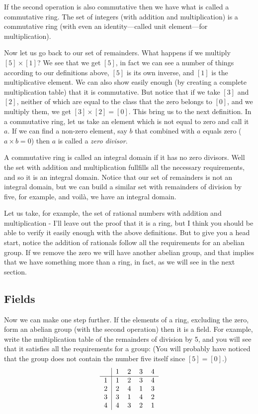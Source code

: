 If the second operation is also commutative then we have what is called
a commutative ring. The set of integers (with addition and
multiplication) is a commutative ring (with even an identity---called
unit element---for multiplication).

Now let us go back to our set of remainders. What happens if we multiply
$[5] \times [1]$? We see that we get $[5]$, in fact we can see a number
of things according to our definitions above, $[5]$ is its own inverse,
and $[1]$ is the multiplicative element. We can also show easily enough
(by creating a complete multiplication table) that it is
commutative. But notice that if we take $[3]$ and $[2]$, neither of
which are equal to the class that the zero belongs to $[0]$, and we
multiply them, we get $[3] \times [2] = [0]$.  This bring us to the next
definition. In a commutative ring, let us take an element which is not
equal to zero and call it $a$. If we can find a non-zero element, say
$b$ that combined with $a$ equals zero ($a \times b = 0$) then $a$ is
called a {\it zero divisor}.

A commutative ring is called an integral domain if it has no zero
divisors.  Well the set \Z{} with addition and multiplication fullfills
all the necessary requirements, and so it is an integral domain. Notice
that our set of remainders is not an integral domain, but we can build a
similar set with remainders of division by five, for example, and
voil\`a, we have an integral domain.

Let us take, for example, the set \Q{} of rational numbers with addition
and multiplication - I'll leave out the proof that it is a ring, but I
think you should be able to verify it easily enough with the above
definitions. But to give you a head start, notice the addition of
rationals follow all the requirements for an abelian group. If we remove
the zero we will have another abelian group, and that implies that we
have something more than a ring, in fact, as we will see in the next
section.

\subsection{Fields}

Now we can make one step further. If the elements of a ring, excluding
the zero, form an abelian group (with the second operation) then it is a
field.  For example, write the multiplication table of the remainders of
division by 5, and you will see that it satisfies all the requirements
for a group: (You will probably have noticed that the group does not
contain the number five itself since $[5] = [0]$.)
\[
\begin{tabular}{  c  |  c  c  c  c  }
    & 1 & 2 & 3 & 4  \\
    \hline
  1 & 1 & 2 & 3 & 4 \\ 
  2 & 2 & 4 & 1 & 3 \\
  3 & 3 & 1 & 4 & 2 \\
  4 & 4 & 3 & 2 & 1
\end{tabular}
\]

